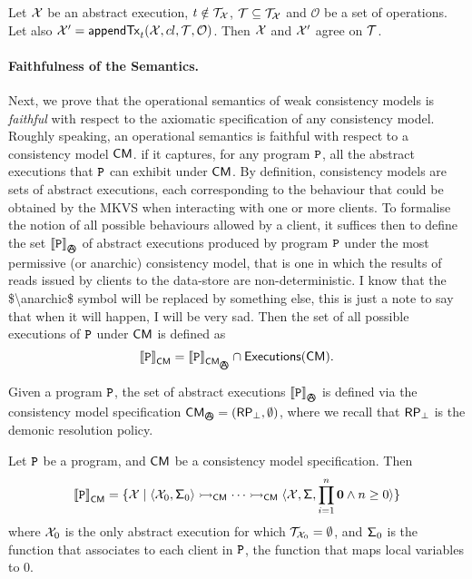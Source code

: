 \begin{proposition}
\label{prop:appendTx.RPpreserved}
Let $\mathcal{X}$ be an abstract execution, $t \notin \mathcal{T}_{\mathcal{X}}$, $\mathcal{T} \subseteq \mathcal{T}_{\mathcal{X}}$ 
and $\mathcal{O}$ be a set of operations. Let also $\mathcal{X}' = \mathsf{appendTx}_{t}(\mathcal{X}, cl, \mathcal{T}, \mathcal{O})$. 
Then $\mathcal{X}$ and $\mathcal{X}'$ agree on $\mathcal{T}$. 
\end{proposition}

\paragraph{Faithfulness of the Semantics.}
Next, we prove that the operational semantics of weak consistency models 
is \emph{faithful} with respect to the axiomatic specification of any consistency 
model. 
Roughly speaking, an operational semantics is faithful with respect to a consistency model 
$\mathsf{CM}$.
if it captures, for any program $\texttt{P}$, all the abstract executions that $\texttt{P}$ can exhibit 
under $\mathsf{CM}$. By definition, consistency models are sets of abstract executions, 
each corresponding to the behaviour that could be obtained by the MKVS when interacting 
with one or more clients. To formalise the notion of all possible behaviours 
allowed by a client, it suffices then to define the set $\interpr{\prog}_{\anarchicsmall}$ of abstract executions 
produced by program $\texttt{P}$ under the most permissive (or anarchic) 
consistency model, that is one in which 
the results of reads issued  by clients to the data-store are non-deterministic. 
\ac{I know that the $\anarchic$ symbol will be replaced by something else, this 
is just a note to say that when it will happen, I will be very sad.}
Then the set of all possible executions of $\texttt{P}$ under $\mathsf{CM}$ is defined as
\[
\interpr{\prog}_{\CM} = 
\interpr{\prog}_{\CM_{\anarchicsmall}} \cap \aeset(\CM).
\]

Given a program $\texttt{P}$, the set of abstract executions $\interpr{\prog}_{\anarchicsmall}$
is defined via the consistency model specification $\CM_{\anarchicsmall} = (\RP_{\bot}, \emptyset)$, 
where we recall that $\mathsf{RP}_{\bot}$ is the demonic resolution policy. 
\begin{definition}
Let $\texttt{P}$ be a program, and $\mathsf{CM}$ be a consistency model specification. Then 
\[ 
{\llbracket \texttt{P} \rrbracket}_{\mathsf{CM}} = \{ \mathcal{X} \mid \langle \mathcal{X}_0, \mathsf{\Sigma}_0 \rangle \rightarrowtail_{\mathsf{CM}} 
\cdots \rightarrowtail_{\mathsf{CM}} 
\langle \mathcal{X}, \mathsf{\Sigma}, \prod_{i=1}^{n} \mathbf{0} \wedge n \geq 0 \rangle \}
\]
where $\mathcal{X}_0$ is the only abstract execution for which $\mathcal{T}_{\mathcal{X}_{0}} = \emptyset$, 
and $\mathsf{\Sigma}_0$ is the function that associates to each client in $\texttt{P}$, the function 
that maps local variables to $0$.
\end{definition}

